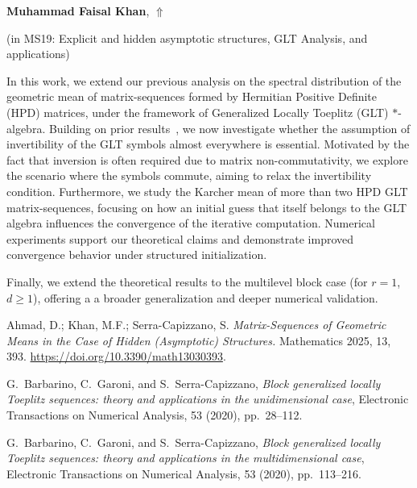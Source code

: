 \documentclass[ILAS2025-program.tex]{subfiles}
\begin{document}
\hypertarget{down0257}{}\begin{ilasabstract}
    
\textbf{Muhammad Faisal Khan},  \hfill \hyperlink{up0257}{$\Uparrow$}
    
    
(in {\color{mstitle}MS19: Explicit and hidden asymptotic structures, GLT Analysis, and applications})
        
\mtskip
    \begin{bibunit}
        In this work, we extend our previous analysis on the spectral distribution of the geometric mean of matrix-sequences formed by Hermitian Positive Definite (HPD) matrices, under the framework of Generalized Locally Toeplitz (GLT) $\ast$-algebra. Building on prior results~\cite{ahmad2025matrix}, we now investigate whether the assumption of invertibility of the GLT symbols almost everywhere is essential. Motivated by the fact that inversion is often required due to matrix non-commutativity, we explore the scenario where the symbols commute, aiming to relax the invertibility condition. Furthermore, we study the Karcher mean of more than two HPD GLT matrix-sequences, focusing on how an initial guess that itself belongs to the GLT algebra influences the convergence of the iterative computation. Numerical experiments support our theoretical claims and demonstrate improved convergence behavior under structured initialization.

Finally, we extend the theoretical results to the multilevel block case (for $r = 1$, $d \geq 1$), offering a a broader generalization and deeper numerical validation. 

\vspace{2em}

\begin{thebibliography}{99}

Ahmad, D.; Khan, M.F.; Serra-Capizzano, S. \textit{Matrix-Sequences of Geometric Means in the Case of Hidden (Asymptotic) Structures.} Mathematics 2025, 13, 393.
\url{https://doi.org/10.3390/math13030393}.

G.~Barbarino, C.~Garoni, and S.~Serra-Capizzano, \textit{Block generalized locally Toeplitz sequences: theory and applications in the unidimensional case},
Electronic Transactions on Numerical Analysis, 53 (2020), pp.~28--112.

G.~Barbarino, C.~Garoni, and S.~Serra-Capizzano,
\textit{Block generalized locally Toeplitz sequences: theory and applications in the multidimensional case},
Electronic Transactions on Numerical Analysis, 53 (2020), pp.~113--216.


\end{thebibliography}
\end{bibunit}
\end{ilasabstract}
\end{document}
